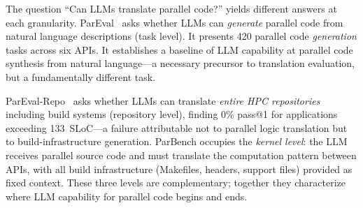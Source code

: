 \documentclass{article}
\begin{document}
The question ``Can LLMs translate parallel code?'' yields different answers at each granularity. ParEval~\cite{ParEval2024} asks whether LLMs can \emph{generate} parallel code from natural language descriptions (task level). It presents 420 parallel code \emph{generation} tasks across six APIs. It establishes a baseline of LLM capability at parallel code synthesis from natural language---a necessary precursor to translation evaluation, but a fundamentally different task. 

ParEval-Repo~\cite{ParEvalRepo2025} asks whether LLMs can translate \emph{entire HPC repositories} including build systems (repository level), finding 0\% pass@1 for applications exceeding 133~SLoC---a failure attributable not to parallel logic translation but to build-infrastructure generation. ParBench occupies the \emph{kernel level}: the LLM receives parallel source code and must translate the computation pattern between APIs, with all build infrastructure (Makefiles, headers, support files) provided as fixed context. These three levels are complementary; together they characterize where LLM capability for parallel code begins and ends.




\end{document}
